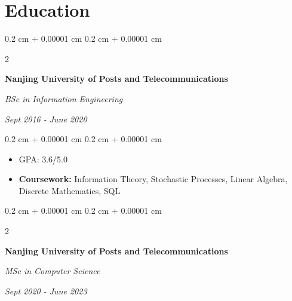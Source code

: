 \documentclass[10pt, letterpaper]{article}
\newenvironment{highlights}{
    \begin{itemize}[
        topsep=0.10 cm,
        parsep=0.10 cm,
        partopsep=0pt,
        itemsep=0pt,
        leftmargin=0.4 cm + 10pt
    ]
}{
    \end{itemize}
} %
\newenvironment{onecolentry}{
    \begin{adjustwidth}{
        0.2 cm + 0.00001 cm
    }{
        0.2 cm + 0.00001 cm
    }
}{
    \end{adjustwidth}
} %
\newenvironment{twocolentry}[2][]{
    \onecolentry
    \def\secondColumn{#2}
    \setcolumnwidth{\fill, 4.5 cm}
    \begin{paracol}{2}
}{
    \switchcolumn \raggedleft \secondColumn
    \end{paracol}
    \endonecolentry
} %
\let\hrefWithoutArrow\href
\renewcommand{\href}[2]{\hrefWithoutArrow{#1}{\ifthenelse{\equal{#2}{}}{ }{#2 }\raisebox{.15ex}{\footnotesize \faExternalLink*}}}
\begin{document}






    \section{Education}

        
        \begin{twocolentry}{
            
            
        \textit{Sept 2016 - June 2020}}
            \textbf{Nanjing University of Posts and Telecommunications}

            \textit{BSc in Information Engineering }
        \end{twocolentry}

        \vspace{0.10 cm}
        \begin{onecolentry}
            \begin{highlights}
                \item GPA: 3.6/5.0
                \item \textbf{Coursework:} Information Theory, Stochastic Processes, Linear Algebra, Discrete Mathematics, SQL
            \end{highlights}
        \end{onecolentry}
        \vspace{0.50 cm}


        \begin{twocolentry}{
            
        
        \textit{Sept 2020 - June 2023}}
            \textbf{Nanjing University of Posts and Telecommunications}

            \textit{MSc in Computer Science}
        \end{twocolentry}
\end{document}
